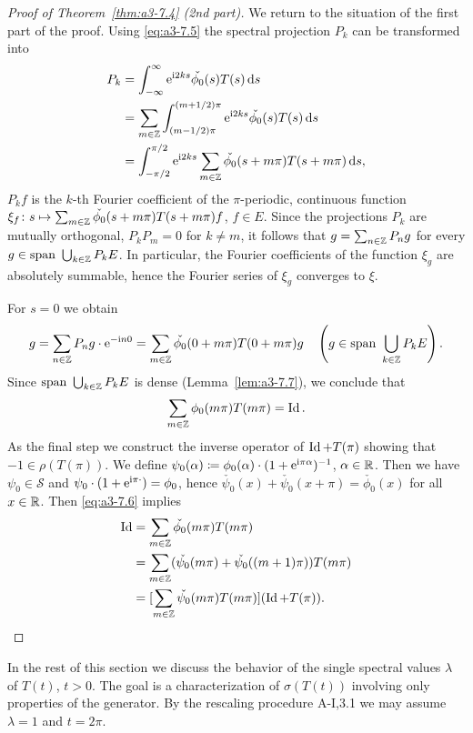 \begin{proof}[Proof of Theorem~\ref{thm:a3-7.4} (2nd part)]
We return to the situation of the first part of the proof.
Using \eqref{eq:a3-7.5} the spectral projection $P_{k}$ can be transformed into
\begin{align*}
P_{k} &= \int_{-\infty}^{\infty} \mathrm{e}^{\mathrm{i} 2ks}\check{\phi_{0}}(s)T(s)\mathop{}\!\mathrm{d}{s} \\
&= \sum_{m\in\mathbb{Z}} \int_{(m-1/2)\pi}^{(m+1/2)\pi} \mathrm{e}^{\mathrm{i} 2ks}\check{\phi_{0}}(s)T(s)\mathop{}\!\mathrm{d}{s} \\
&= \int_{-\pi/2}^{\pi/2} \mathrm{e}^{\mathrm{i} 2ks}\sum_{m\in\mathbb{Z}}\check{\phi_{0}}(s+m\pi)T(s+m\pi)\mathop{}\!\mathrm{d}{s} ,
\end{align*}
\ie $P_{k}f$ is the $k$-th Fourier coefficient of the $\pi$-periodic, continuous function $\xi_{f} \colon s \mapsto \sum_{m\in\mathbb{Z}} \check{\phi_{0}}(s+m\pi)T(s+m\pi)f$, $f \in E$.
Since the projections $P_{k}$ are mutually orthogonal, \ie $P_{k}P_{m} = 0$ for $k \neq m$, it follows that $g = \sum_{n\in\mathbb{Z}} P_{n}g$ for every $g \in \text{span }\bigcup_{k\in\mathbb{Z}} P_{k}E$.
In particular, the Fourier coefficients of the function $\xi_{g}$ are absolutely summable, hence the Fourier series of $\xi_{g}$ converges to $\xi$.

For $s = 0$ we obtain
\[
g = \sum_{n\in\mathbb{Z}} P_{n}g\cdot \mathrm{e}^{-\mathrm{i} n0} = \sum_{m\in\mathbb{Z}} \check{\phi_{0}}(0 + m\pi)T(0 + m\pi)g \quad 
\left(g \in \text{span }\bigcup_{k\in\mathbb{Z}} P_{k}E\right) .
\]
Since $\text{span }\bigcup_{k\in\mathbb{Z}} P_{k}E$ is dense (Lemma~\ref{lem:a3-7.7}), we conclude that
\begin{equation}\label{eq:a3-7.6}
\sum_{m\in\mathbb{Z}} \phi_{0}(m\pi)T(m\pi) = \operatorname{Id} .
\end{equation}
As the final step we construct the inverse operator of $\operatorname{Id} + T(\pi)$ showing that $-1 \in \rho(T(\pi))$.
We define $\psi_{0}(\alpha) \coloneqq \phi_{0}(\alpha)\cdot(1 + \mathrm{e}^{\mathrm{i}\pi\alpha})^{-1}$, $\alpha \in \mathbb{R}$.
Then we have $\psi_{0} \in \mathcal{S}$ and $\psi_{0}\cdot(1 + \mathrm{e}^{\mathrm{i}\pi\cdot}) = \phi_{0}$,
hence $\check{\psi_{0}}(x) + \check{\psi_{0}}(x + \pi) = \check{\phi_{0}}(x)$ for all $x \in \mathbb{R}$.
Then \eqref{eq:a3-7.6} implies
\begin{align*}
\operatorname{Id} &= \sum_{m\in\mathbb{Z}} \check{\phi_{0}}(m\pi)T(m\pi) \\
&= \sum_{m\in\mathbb{Z}} (\check{\psi_{0}}(m\pi) + \check{\psi_{0}}((m+1)\pi))T(m\pi) \\
&= [\sum_{m\in\mathbb{Z}} \check{\psi_{0}}(m\pi)T(m\pi)](\operatorname{Id} + T(\pi)) .
\end{align*}
\end{proof}
In the rest of this section we discuss the behavior of the single spectral values $\lambda$ of $T(t)$, $t > 0$.
The goal is a characterization of $\sigma(T(t))$ involving only properties of the generator.
By the rescaling procedure A-I,3.1 we may assume $\lambda = 1$ and $t = 2\pi$.

